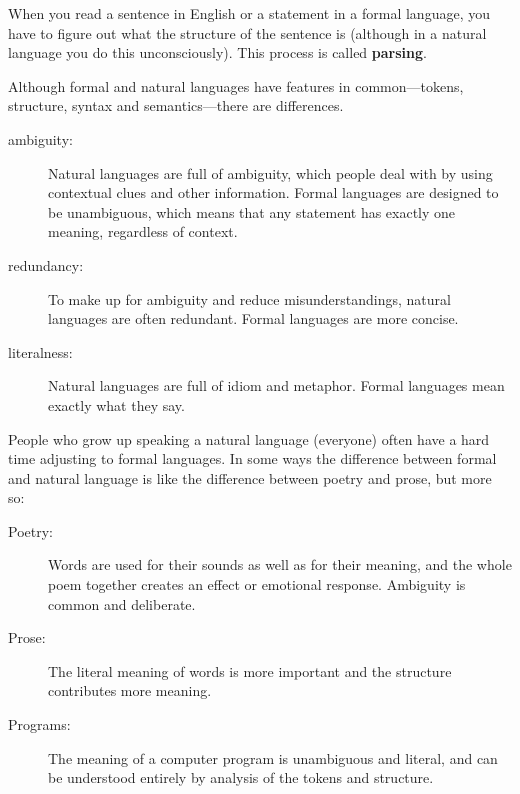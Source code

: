 \documentclass[12pt]{book}
\theoremstyle{exercise}
\begin{document}
When you read a sentence in English or a statement in a formal
language, you have to figure out what the structure of the sentence is
(although in a natural language you do this unconsciously).  This
process is called {\bf parsing}.


Although formal and natural languages have features in
common---tokens, structure, syntax and semantics---there are
differences.


\begin{description}

\item[ambiguity:] Natural languages are full of ambiguity, which
  people deal with by using contextual clues and other information.
  Formal languages are designed to be unambiguous, which means that
  any statement has exactly one meaning, regardless of context.

\item[redundancy:] To make up for ambiguity and reduce
  misunderstandings, natural languages are often redundant.  Formal
  languages are more concise.

\item[literalness:] Natural languages are full of idiom and
metaphor.  Formal languages mean exactly what they say.

\end{description}

People who grow up speaking a natural language (everyone) often have a
hard time adjusting to formal languages.  In some ways the difference
between formal and natural language is like the difference between
poetry and prose, but more so:


\begin{description}

\item[Poetry:] Words are used for their sounds as well as for
their meaning, and the whole poem together creates an effect or
emotional response.  Ambiguity is common and deliberate.

\item[Prose:] The literal meaning of words is more important
and the structure contributes more meaning.

\item[Programs:] The meaning of a computer program is unambiguous
and literal, and can be understood entirely by analysis of the
tokens and structure.

\end{description}
\end{document}
